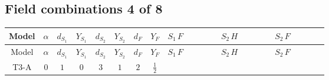 \documentclass[8pt]{article}
\begin{document}
\begin{landscape}
\subsection*{Field combinations 4 of 8}
\begin{longtable}{@{}cccccccc >{\raggedright\arraybackslash}p{0.21\linewidth} >{\raggedright\arraybackslash}p{0.21\linewidth} >{\raggedright\arraybackslash}p{0.21\linewidth}@{}}
\toprule
Model & $\alpha$ & $d_{S_1}$ & $Y_{S_1}$ & $d_{S_2}$ & $Y_{S_2}$ & $d_F$ & $Y_F$ & $S_1\,F$ & $S_2\,H$ & $S_2\,F$ \\
\midrule
\endfirsthead
\toprule
Model & $\alpha$ & $d_{S_1}$ & $Y_{S_1}$ & $d_{S_2}$ & $Y_{S_2}$ & $d_F$ & $Y_F$ & $S_1\,F$ & $S_2\,H$ & $S_2\,F$ \\
\midrule
\endhead
T3-A & $0$ & $1$ & $0$ & $3$ & $1$ & $2$ & $\frac{1}{2}$ & \scriptsize\adjustbox{max width=\linewidth}{$\begin{gathered} -2 \hbar  \log \left(\frac{\bar{\mu}^{2}}{M_F^2}\right) \overline{y_{1,i_1,r_1}} \overline{y_{1,i_2,r_2}} S_1^2 y_{1,i_1,r_2} y_{1,i_2,r_1} \left(S_1{}^{\dagger }\right){}^2 \\ +2 C_{S_1^\dagger S_1} \hbar  \log \left(\frac{\bar{\mu}^{2}}{M_F^2}\right) \overline{y_{1,i_1,r_1}} S_1 y_{1,i_1,r_1} S_1{}^{\dagger } \\ -2 \hbar  \log \left(\frac{\bar{\mu}^{2}}{M_F^2}\right) \overline{y_{1,i_1,r_1}} S_1^2 y_{1,i_1,r_1} \left(S_1{}^{\dagger }\right){}^2 \lambda_{S_1}^{(1)}^{(1)}\end{gathered}$} & \scriptsize\adjustbox{max width=\linewidth}{$\begin{gathered} -\frac{2 \hbar  \overline{y_{2,i_1,r_1}} \overline{Y_{e,i_2,i_3}} H_{a_1} S_{2,j_1} y_{2,i_2,r_1} Y_{e,i_1,i_3} H_{a_1}{}^{\dagger } S_{2,j_1}{}^{\dagger }}{\sqrt{3} \epsilon } \\ -\frac{2 \hbar  \overline{y_{2,i_1,r_1}} \overline{Y_{e,i_2,i_3}} H_{a_1} S_{2,j_1} y_{2,i_2,r_1} Y_{e,i_1,i_3} H_{a_1}{}^{\dagger } S_{2,j_1}{}^{\dagger }}{\sqrt{3}} \\ -\frac{2 i \sqrt{\frac{2}{3}} \hbar  \overline{y_{2,i_1,r_1}} \overline{Y_{e,i_2,i_3}} H_{a_2} S_{2,j_2} y_{2,i_2,r_1} Y_{e,i_1,i_3} H_{a_1}{}^{\dagger } S_{2,j_1}{}^{\dagger } \mathcal{I}_{H2,a_1,a_2,j_1,j_2}{}^1}{\epsilon }\end{gathered}$} & \scriptsize\adjustbox{max width=\linewidth}{$\begin{gathered} +\frac{2}{3} \hbar  \log \left(\frac{\bar{\mu}^{2}}{M_F^2}\right) \overline{y_{2,i_1,r_1}} \overline{y_{2,i_2,r_2}} S_{2,j_2}^2 y_{2,i_1,r_2} y_{2,i_2,r_1} \left(S_{2,j_1}{}^{\dagger }\right){}^2 \\ +\frac{2 C_{S_2^\dagger S_2} \hbar  \log \left(\frac{\bar{\mu}^{2}}{M_F^2}\right) \overline{y_{2,i_1,r_1}} S_{2,j_1} y_{2,i_1,r_1} S_{2,j_1}{}^{\dagger }}{\sqrt{3}} \\ -\frac{4}{3} \hbar  \log \left(\frac{\bar{\mu}^{2}}{M_F^2}\right) \overline{y_{2,i_1,r_1}} \overline{y_{2,i_2,r_2}} S_{2,j_1} S_{2,j_2} y_{2,i_1,r_2} y_{2,i_2,r_1} S_{2,j_1}{}^{\dagger } S_{2,j_2}{}^{\dagger }\end{gathered}$} \\

\end{longtable}
\end{landscape}
\end{document}
